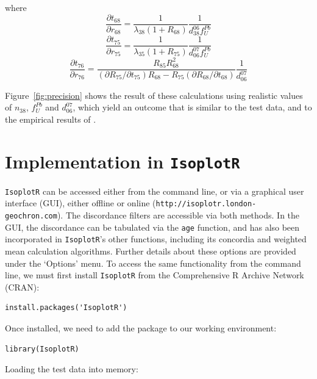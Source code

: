 \documentclass[gchron, manuscript]{copernicus}
\begin{document}
where
\begin{equation}
    \frac{\partial{t_{68}}}{\partial{r_{68}}} = 
    \frac{1}{\lambda_{38}(1+R_{68})} \frac{1}{d^{06}_{38}f^{Pb}_{U}}
\end{equation}
\begin{equation}  
    \frac{\partial{t_{75}}}{\partial{r_{75}}} = 
    \frac{1}{\lambda_{35}(1+R_{75})} \frac{1}{d^{07}_{06}f^{Pb}_{U}}
\end{equation}
\begin{equation}  
  \frac{\partial{t_{76}}}{\partial{r_{76}}} =
  \frac{R_{85}R_{68}^2}
       {(\partial{R_{75}}/\partial{t_{75}})R_{68} -
         R_{75}(\partial{R_{68}}/\partial{t_{68}})}
       \frac{1}{d^{07}_{06}}
\end{equation}

Figure~\ref{fig:precision} shows the result of these calculations
using realistic values of $n_{38}$, $f^{Pb}_{U}$ and $d^{07}_{06}$,
which yield an outcome that is similar to the test data, and to the
empirical results of \citet{zimmermann2018}.

\section{Implementation in \texttt{IsoplotR}}
\label{app:IsoplotR}

\texttt{IsoplotR} can be accessed either from the command line, or via
a graphical user interface (GUI), either offline or online
(\texttt{http://isoplotr.london-geochron.com}).  The discordance
filters are accessible via both methods. In the GUI, the discordance
can be tabulated via the \texttt{age} function, and has also been
incorporated in \texttt{IsoplotR}'s other functions, including its
concordia and weighted mean calculation algorithms.  Further details
about these options are provided under the `Options' menu. To access
the same functionality from the command line, we must first install
\texttt{IsoplotR} from the Comprehensive R Archive Network (CRAN):

\begin{verbatim}
install.packages('IsoplotR')
\end{verbatim}

\noindent Once installed, we need to add the package to our working
environment:

\begin{verbatim}
library(IsoplotR)
\end{verbatim}

\noindent Loading the test data into memory:
\end{document}
